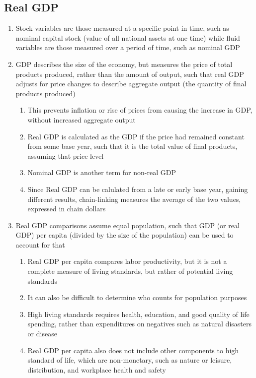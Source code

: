 \documentclass[11 pt, twoside]{article}
\begin{document}
\subsection{Real GDP}
\begin{enumerate}
\item Stock variables are those measured at a specific point in time, such as nominal capital stock (value of all national assets at one time) while fluid variables are those measured over a period of time, such as nominal GDP
\item GDP describes the size of the economy, but measures the price of total products produced, rather than the amount of output, such that real GDP adjusts for price changes to describe aggregate output (the quantity of final products produced)
\begin{enumerate}
\item This prevents inflation or rise of prices from causing the increase in GDP, without increased aggregate output
\item Real GDP is calculated as the GDP if the price had remained constant from some base year, such that it is the total value of final products, assuming that price level
\item Nominal GDP is another term for non-real GDP
\item Since Real GDP can be calulated from a late or early base year, gaining different results, chain-linking measures the average of the two values, expressed in chain dollars
\end{enumerate}
\item Real GDP comparisons assume equal population, such that GDP (or real GDP) per capita (divided by the size of the population) can be used to account for that
\begin{enumerate}
\item Real GDP per capita compares labor productivity, but it is not a complete measure of living standards, but rather of potential living standards
\item It can also be difficult to determine who counts for population purposes
\item High living standards requires health, education, and good quality of life spending, rather than expenditures on negatives such as natural disasters or disease
\item Real GDP per capita also does not include other components to high standard of life, which are non-monetary, such as nature or leisure, distribution, and workplace health and safety
\end{enumerate}
\end{enumerate}
\end{document}
